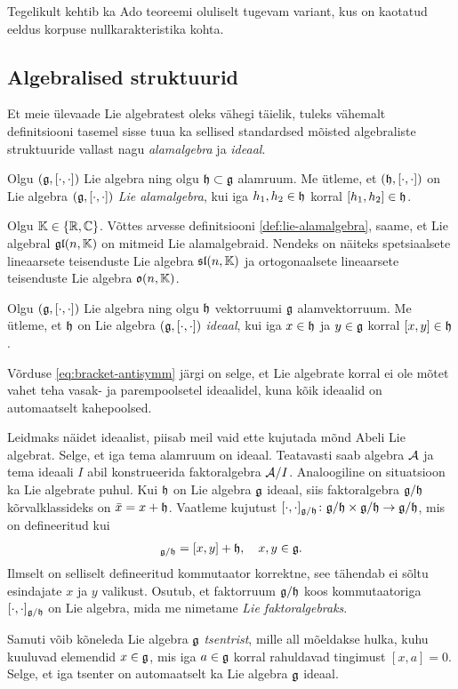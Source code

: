 Tegelikult kehtib ka Ado teoreemi oluliselt tugevam variant,
kus on kaotatud eeldus korpuse nullkarakteristika
kohta. \cite{hochschild1966}

\subsection{Algebralised struktuurid}\label{subsec:algebralised-struktuurid}

Et meie ülevaade Lie algebratest oleks vähegi täielik, tuleks vähemalt
definitsiooni tasemel sisse tuua ka sellised standardsed mõisted algebraliste
struktuuride vallast nagu \emph{alamalgebra} ja \emph{ideaal}.

\begin{dfn}\label{def:lie-alamalgebra}
    Olgu $(\mathfrak{g}, [\cdot, \cdot])$ Lie algebra ning olgu $\mathfrak{h} \subset \mathfrak{g}$ alamruum.
    Me ütleme, et $(\mathfrak{h}, [\cdot, \cdot])$ on Lie algebra $(\mathfrak{g}, [\cdot, \cdot])$
    \emph{Lie alamalgebra}, kui iga $h_1, h_2 \in \mathfrak{h}$ korral
    $[h_1, h_2] \in \mathfrak{h}$.
\end{dfn}

Olgu $\mathbb{K} \in \{\mathbb{R}, \mathbb{C}\}$. Võttes arvesse definitsiooni
\ref{def:lie-alamalgebra}, saame, et Lie algebral $\mathfrak{gl}(n, \mathbb{K})$ on mitmeid
Lie alamalgebraid. Nendeks on näiteks spetsiaalsete lineaarsete teisenduste
Lie algebra $\mathfrak{sl}(n, \mathbb{K})$ ja ortogonaalsete lineaarsete teisenduste
Lie algebra $\mathfrak{o}(n, \mathbb{K})$.

\begin{dfn}
    Olgu $(\mathfrak{g}, [\cdot, \cdot])$ Lie algebra ning olgu $\mathfrak{h}$ vektorruumi $\mathfrak{g}$
    alamvektorruum. Me ütleme, et $\mathfrak{h}$ on Lie algebra
    $(\mathfrak{g}, [\cdot, \cdot])$ \emph{ideaal}, kui iga $x \in \mathfrak{h}$ ja $y \in \mathfrak{g}$
    korral $[x, y] \in \mathfrak{h}$.
\end{dfn}

Võrduse \eqref{eq:bracket-antisymm} järgi on selge, et Lie algebrate
korral ei ole mõtet vahet teha vasak- ja
parempoolsetel ideaalidel, kuna kõik ideaalid on automaatselt kahepoolsed.

Leidmaks näidet ideaalist, piisab meil vaid ette kujutada mõnd Abeli
Lie algebrat. Selge, et iga tema alamruum on ideaal. Teatavasti saab
algebra $\mathcal{A}$ ja tema ideaali $I$ abil konstrueerida faktoralgebra
$\mathcal{A} / I$. Analoogiline
on situatsioon ka Lie algebrate puhul. Kui $\mathfrak{h}$ on Lie algebra $\mathfrak{g}$ ideaal,
siis faktoralgebra $\mathfrak{g} / \mathfrak{h}$ kõrvalklassideks on $\bar{x} = x + \mathfrak{h}$.
Vaatleme kujutust
$[\cdot, \cdot]_{\mathfrak{g} / \mathfrak{h}} \colon \mathfrak{g} / \mathfrak{h} \times \mathfrak{g} / \mathfrak{h} \to \mathfrak{g} / \mathfrak{h}$,
mis on defineeritud kui
\begin{align*}
    [x+\h, y+\h]_{\g / \h} = [x, y] + \h, \quad x, y \in \g.
\end{align*}
Ilmselt on selliselt defineeritud kommutaator korrektne, see tähendab ei sõltu
esindajate $x$ ja $y$ valikust. Osutub, et faktorruum $\mathfrak{g} / \mathfrak{h}$ koos
kommutaatoriga $[\cdot, \cdot]_{\mathfrak{g} / \mathfrak{h}}$ on Lie algebra, mida me
nimetame \emph{Lie faktoralgebraks}.

Samuti võib kõneleda Lie algebra $\mathfrak{g}$ \emph{tsentrist}, mille all mõeldakse
hulka, kuhu kuuluvad elemendid $x \in \mathfrak{g}$, mis iga $a \in \mathfrak{g}$ korral rahuldavad
tingimust $[x, a] = 0$. Selge, et iga tsenter on automaatselt ka Lie algebra
$\mathfrak{g}$ ideaal.

